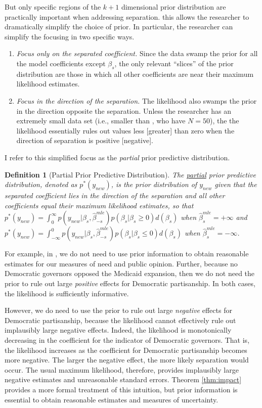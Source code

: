 \documentclass[12pt]{article}
\newtheorem{defn}{Definition}
\begin{document}
But only specific regions of the $k + 1$ dimensional prior distribution are practically important when addressing separation. this allows the researcher to dramatically simplify the choice of prior. In particular, the researcher can simplify the focusing in two specific ways.
\begin{enumerate}
\item \emph{Focus only on the separated coefficient.} Since the data swamp the prior for all the model coefficients except $\beta_s$, the only relevant ``slices'' of the prior distribution are those in which all other coefficients are near their maximum likelihood estimates.
\item \emph{Focus in the direction of the separation.} The likelihood also swamps the prior in the direction opposite the separation. Unless the researcher has an extremely small data set (i.e., smaller than \cite{BarrilleauxRainey2014}, who have $N = 50$), the the likelihood essentially rules out values less [greater] than zero when the direction of separation is positive [negative].
\end{enumerate}

I refer to this simplified focus as the \emph{partial} prior predictive distribution.

\begin{defn}[Partial Prior Predictive Distribution]\label{def:pppd} The \underline{partial} prior predictive distribution, denoted as $p^*(y_{new})$, is the prior distribution of $y_{new}$ given that the separated coefficient lies in the direction of the separation and all other coefficients equal their maximum likelihood estimates, so that $p^*(y_{new}) = \int_{0}^{\infty} p(y_{new} | \beta_s, \hat{\beta}_{-s}^{mle})p(\beta_s | \beta_s \geq 0)d(\beta_s)$ when $\hat{\beta}_{s}^{mle} = +\infty$ and $p^*(y_{new}) = \int_{-\infty}^{0} p(y_{new} | \beta_s, \hat{\beta}_{-s}^{mle})p(\beta_s | \beta_s \leq 0)d(\beta_s)$ when $\hat{\beta}_{s}^{mle} = -\infty$.
\end{defn}

For example, in \cite{BarrilleauxRainey2014}, we do not need to use prior information to obtain reasonable estimates for our measures of need and public opinion. Further, because no Democratic governors opposed the Medicaid expansion, then we do not need the prior to rule out large \textit{positive} effects for Democratic partisanship. In both cases, the likelihood is sufficiently informative. 

However, we do need to use the prior to rule out large \textit{negative} effects for Democratic partisanship, because the likelihood cannot effectively rule out implausibly large negative effects. Indeed, the likelihood is monotonically decreasing in the coefficient for the indicator of Democratic governors. That is, the likelihood increases as the coefficient for Democratic partisanship becomes more negative. The larger the negative effect, the more likely separation would occur. The usual maximum likelihood, therefore, provides implausibly large negative estimates and unreasonable standard errors. Theorem \ref{thm:impact} provides a more formal treatment of this intuition, but prior information is essential to obtain reasonable estimates and measures of uncertainty. 
\end{document}
